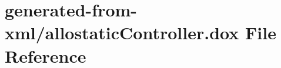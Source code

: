 \hypertarget{allostaticController_8dox}{}\section{generated-\/from-\/xml/allostatic\+Controller.dox File Reference}
\label{allostaticController_8dox}
